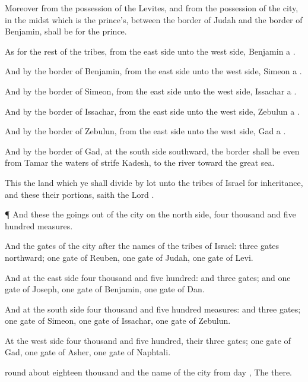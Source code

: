 {Moreover from the
possession of the
Levites, and from the
possession of the
city,
{} in the
midst
{} which is the
prince’s, between the
border of
Judah and the
border of
Benjamin, shall be for the
prince.

As for the
rest of the
tribes, from the
east
side unto the
west
side,
Benjamin
{}
a
{}.

And by the
border of
Benjamin, from the
east
side unto the
west
side,
Simeon
{}
a
{}.

And by the
border of
Simeon, from the
east
side unto the
west
side,
Issachar
a
{}.

And by the
border of
Issachar, from the
east
side unto the
west
side,
Zebulun
a
{}.

And by the
border of
Zebulun, from the
east
side unto the
west
side,
Gad
a
{}.

And by the
border of
Gad, at the
south
side
southward, the
border shall be even from
Tamar
{} the
waters of
strife
{}
Kadesh,
{} to the
river toward the
great
sea.

This
{} the
land which ye shall
divide by lot unto the
tribes of
Israel for
inheritance, and these
{} their
portions,
saith the
Lord
{}.


\par }{\PP {}¶ And these
{} the goings
out of the
city on the
north
side,
four
thousand and
five
hundred
measures.


\par }{\PP {}And the
gates of the
city
{} after the
names of the
tribes of
Israel:
three
gates
northward;
one
gate of
Reuben,
one
gate of
Judah,
one
gate of
Levi.

And at the
east
side
four
thousand and
five
hundred: and
three
gates; and
one
gate of
Joseph,
one
gate of
Benjamin,
one
gate of
Dan.

And at the
south
side
four
thousand and
five
hundred
measures: and
three
gates;
one
gate of
Simeon,
one
gate of
Issachar,
one
gate of
Zebulun.

At the
west
side
four
thousand and
five
hundred,
{} their
three
gates;
one
gate of
Gad,
one
gate of
Asher,
one
gate of
Naphtali.

 round
about
eighteen
thousand
{} and the
name of the
city from
{}
day
{}, The
{}
{}
there.


\par }